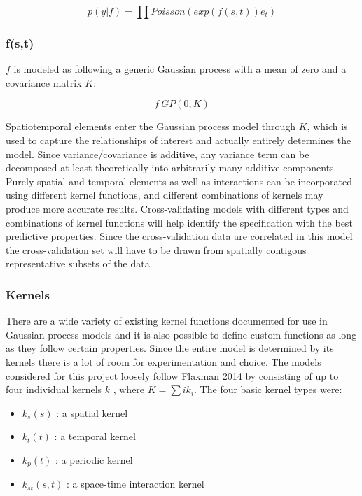 \documentclass{article}
\begin{document}
$$p(y|f) = \prod{ Poisson(exp(f(s,t))e_t)}$$

\subsubsection{f(s,t)}

$f$ is modeled as following a generic Gaussian process with a mean of zero and a covariance matrix $K$:

$$ f ~ GP(0,K) $$

Spatiotemporal elements enter the Gaussian process model through $K$, which is used to capture the relationships of interest and actually entirely determines the model. Since variance/covariance is additive, any variance term can be decomposed at least theoretically into arbitrarily many additive components. Purely spatial and temporal elements as well as interactions can be incorporated using different kernel functions, and different combinations of kernels may produce more accurate results. Cross-validating models with different types and combinations of kernel functions will help identify the specification with the best predictive properties. Since the cross-validation data are correlated in this model the cross-validation set will have to be drawn from spatially contigous representative subsets of the data.

\subsubsection{Kernels}

There are a wide variety of existing kernel functions documented for use in Gaussian process models \cite{rasmussen_2005} and it is also possible to define custom functions as long as they follow certain properties. Since the entire model is determined by its kernels there is a lot of room for experimentation and choice. The models considered for this project loosely follow Flaxman 2014 by consisting of up to four individual kernels $k$ , where $K=\sum{i}k_i$. The four basic kernel types were:

\begin{itemize}
  \item $k_s(s)$ : a spatial kernel
  \item $k_t(t)$ : a temporal kernel
  \item $k_p(t)$ : a periodic kernel
  \item $k_{st}(s,t)$ : a space-time interaction kernel
\end{itemize}
\end{document}
